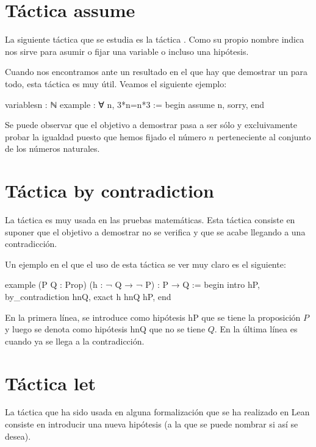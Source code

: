 \section{Táctica assume}

La siguiente táctica que se estudia es la táctica
. Como su propio nombre indica nos sirve para
asumir o fijar una variable o incluso una hipótesis.

Cuando nos encontramos ante un resultado en el que hay que demostrar un
para todo, esta táctica es muy útil. Veamos el siguiente ejemplo:

\begin{leancode}
variables{n : ℕ}
example : ∀ n, 3*n=n*3 :=
begin
  assume n,
  sorry,
end
\end{leancode}

Se puede observar que el objetivo a demostrar pasa a ser sólo y
excluivamente probar la igualdad puesto que hemos fijado el número \(n\)
perteneciente al conjunto de los números naturales.

\section{Táctica by contradiction}

La táctica  es
muy usada en las pruebas matemáticas. Esta táctica consiste en suponer
que el objetivo a demostrar no se verifica y que se acabe llegando a una
contradicción.

Un ejemplo en el que el uso de esta táctica se ver muy claro es el
siguiente:

\begin{leancode}
example (P Q : Prop) (h : ¬ Q → ¬ P) : P → Q :=
begin
  intro hP,
  by_contradiction hnQ,
  exact h hnQ hP,
end
\end{leancode}

En la primera línea, se introduce como hipótesis hP que se tiene la
proposición \(P\) y luego se denota como hipótesis hnQ que no se tiene
\(Q\). En la última línea es cuando ya se llega a la contradicción.

\section{Táctica let}

La táctica  que ha sido usada en alguna formalización
que se ha realizado en Lean consiste en introducir una nueva hipótesis
(a la que se puede nombrar si así se desea).

